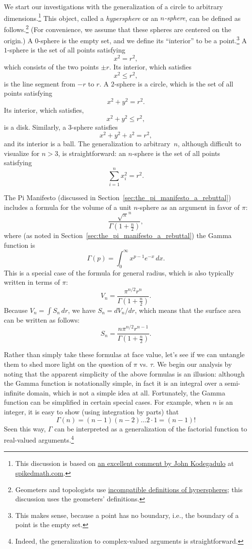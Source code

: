 We start our investigations with the generalization of a circle to arbitrary dimensions.\footnote{This discussion is based on \href{http://spikedmath.com/forum/viewtopic.php?f=30&t=147\#p1577}{an excellent comment by John Kodegadulo} at \href{http://spikedmath.com/}{spikedmath.com}.} This object, called a \emph{hypersphere} or an \emph{$n$-sphere}, can be defined as follows.\footnote{Geometers and topologists use \href{http://mathworld.wolfram.com/Hypersphere.html}{incompatible definitions of hyperspheres}; this discussion uses the geometers' definitions.} (For convenience, we assume that these spheres are centered on the origin.) A $0$-sphere is the empty set, and we define its ``interior'' to be a point.\footnote{This makes sense, because a point has no boundary, i.e., the boundary of a point is the empty set.} A $1$-sphere is the set of all points satisfying
\[
x^2 = r^2,
\]
which consists of the two points $\pm r$. Its interior, which satisfies
\[
x^2 \leq r^2,
\]
is the line segment from $-r$ to $r$. A $2$-sphere is a circle, which is the set of all points satisfying
\[
x^2 + y^2 = r^2.
\]
Its interior, which satisfies,
\[
x^2 + y^2 \leq r^2,
\]
is a disk. Similarly, a $3$-sphere satisfies
\[
x^2 + y^2 + z^2 = r^2,
\]
and its interior is a ball. The generalization to arbitrary~$n$, although difficult to visualize for $n > 3$, is straightforward: an $n$-sphere is the set of all points satisfying
\[
\sum_{i=1}^{n} x_i^2 = r^2.
\]

The Pi Manifesto (discussed in Section~\ref{sec:the_pi_manifesto_a_rebuttal}) includes a formula for the volume of a unit $n$-sphere as an argument in favor of $\pi$:
\[
\frac{\sqrt{\pi}^{n} }{\Gamma(1 + \frac{n}{2})},
\]
where (as noted in Section~\ref{sec:the_pi_manifesto_a_rebuttal}) the Gamma function is
\[ \Gamma(p) = \int_{0}^{\infty} x^{p-1} e^{-x}\,dx.
\]
This is a special case of the formula for general radius, which is also typically written in terms of $\pi$:
\[ V_n = \frac{\pi^{n/2} r^n}{\Gamma(1 + \frac{n}{2})}. \]
Because $V_n = \int S_n\,dr$, we have $S_n = dV_n/dr$, which means that the surface area can be written as follows:
\[ S_n = \frac{n \pi^{n/2} r^{n-1}}{\Gamma(1 + \frac{n}{2})}. \]

Rather than simply take these formulas at face value, let's see if we can untangle them to shed more light on the question of $\pi$ vs. $\tau$. We begin our analysis by noting that the apparent simplicity of the above formulas is an illusion: although the Gamma function is notationally simple, in fact it is an integral over a semi-infinite domain, which is not a simple idea at all. Fortunately, the Gamma function can be simplified in certain special cases. For example, when $n$ is an integer, it is easy to show (using integration by parts) that
\[
\Gamma(n) = (n-1)(n-2)\ldots 2\cdot 1 = (n-1)!
\]
Seen this way, $\Gamma$ can be interpreted as a generalization of the factorial function to real-valued arguments.\footnote{Indeed, the generalization to complex-valued arguments is straightforward.}

